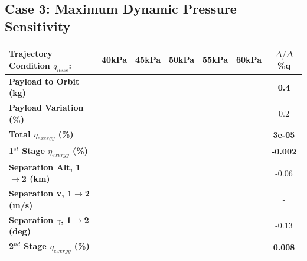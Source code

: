 \subsection{Case 3: Maximum Dynamic Pressure Sensitivity}\label{sec:qvariation}


\begin{table}[ht!]
	\centering
	\begin{tabular}{l c c c c c c} 
		\hline \textbf{Trajectory Condition  \qquad  $q_{max}$: }
		&40kPa
		&45kPa
		&50kPa
		& 55kPa
		& 60kPa
		& $\Delta/\Delta$\%q
	\\
	\hline \textbf{Payload to Orbit (kg)}
	& \textbf{\PayloadToOrbitqFortyNoReturn}
	& \textbf{\PayloadToOrbitqFortyFiveNoReturn}
	& \textbf{\PayloadToOrbitqStandardNoReturn}
	& \textbf{\PayloadToOrbitqFiftyFiveNoReturn}
	& \textbf{\PayloadToOrbitqSixtyNoReturn}
	&\textbf{0.4}
	\\
	\textbf{Payload Variation (\%)}
	& \PayloadVarqFortyNoReturn
	& \PayloadVarqFortyFiveNoReturn
	& \PayloadVarqStandardNoReturn
	& \PayloadVarqFiftyFiveNoReturn
	& \PayloadVarqSixtyNoReturn
	&0.2
	\\
	\textbf{Total $\eta_{exergy}$ (\%)}
	& \textbf{\totalExergyEffqFortyNoReturn}
	& \textbf{\totalExergyEffqFortyFiveNoReturn}
	& \textbf{\totalExergyEffqStandardNoReturn}
	& \textbf{\totalExergyEffqFiftyFiveNoReturn}
	& \textbf{\totalExergyEffqSixtyNoReturn}
	& \textbf{3e-05}
	\\
	\hline 
	\textbf{1$^{st}$ Stage $\eta_{exergy}$ (\%)}
	& \textbf{\firstExergyEffqFortyNoReturn}
	& \textbf{\firstExergyEffqFortyFiveNoReturn}
	& \textbf{\firstExergyEffqStandardNoReturn}
	& \textbf{\firstExergyEffqFiftyFiveNoReturn}
	& \textbf{\firstExergyEffqSixtyNoReturn}
	& \textbf{-0.002}
	\\

	\textbf{Separation Alt, 1$\rightarrow$2 (km)}
	& \firstsecondSeparationAltqFortyNoReturn
	& \firstsecondSeparationAltqFortyFiveNoReturn
	& \firstsecondSeparationAltqStandardNoReturn
	& \firstsecondSeparationAltqFiftyFiveNoReturn
	& \firstsecondSeparationAltqSixtyNoReturn
	&-0.06
	\\
	\textbf{Separation v, 1$\rightarrow$2 (m/s)}
	& \firstsecondSeparationvqFortyNoReturn
	& \firstsecondSeparationvqFortyFiveNoReturn
	& \firstsecondSeparationvqStandardNoReturn
	& \firstsecondSeparationvqFiftyFiveNoReturn
	& \firstsecondSeparationvqSixtyNoReturn
	& -
	\\
	\textbf{Separation $\gamma$, 1$\rightarrow$2 (deg)}
	& \firstsecondSeparationgammaqFortyNoReturn
	& \firstsecondSeparationgammaqFortyFiveNoReturn
	& \firstsecondSeparationgammaqStandardNoReturn
	& \firstsecondSeparationgammaqFiftyFiveNoReturn
	& \firstsecondSeparationgammaqSixtyNoReturn
	&-0.13
	\\
	\hline 
	\textbf{2$^{nd}$ Stage $\eta_{exergy}$ (\%)}
	& \textbf{\secondExergyEffqFortyNoReturn}
	& \textbf{\secondExergyEffqFortyFiveNoReturn}
	& \textbf{\secondExergyEffqStandardNoReturn}
	& \textbf{\secondExergyEffqFiftyFiveNoReturn}
	& \textbf{\secondExergyEffqSixtyNoReturn}
	& \textbf{0.008}
	\\


\end{tabular}
\end{table}
